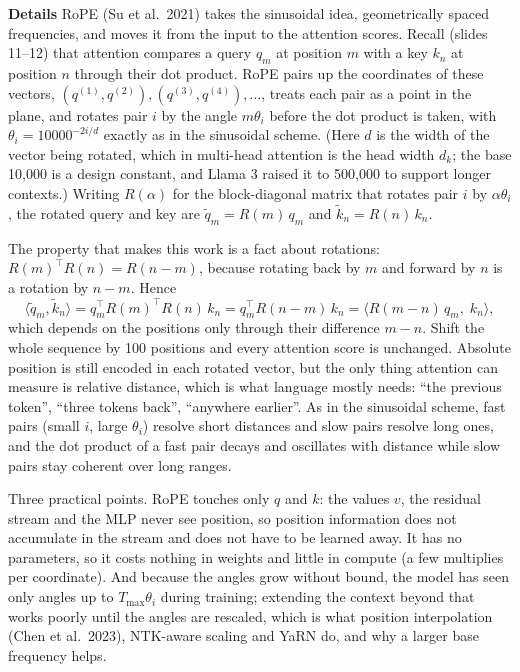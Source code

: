 \documentclass[11pt,letterpaper]{article}
\newcommand{\para}[1]{\medskip\noindent\textbf{#1}\quad}
\newcommand{\dk}{d_k}
\newcommand{\Tmax}{T_{\max}}
\begin{document}
\para{Details} RoPE (Su et al.\ 2021) takes the sinusoidal idea, geometrically spaced frequencies, and moves it from the input to the attention scores. Recall (slides 11--12) that attention compares a query $q_m$ at position $m$ with a key $k_n$ at position $n$ through their dot product. RoPE pairs up the coordinates of these vectors, $(q^{(1)},q^{(2)}),(q^{(3)},q^{(4)}),\dots$, treats each pair as a point in the plane, and rotates pair $i$ by the angle $m\theta_i$ before the dot product is taken, with $\theta_i=10000^{-2i/d}$ exactly as in the sinusoidal scheme. (Here $d$ is the width of the vector being rotated, which in multi-head attention is the head width $\dk$; the base 10,000 is a design constant, and Llama 3 raised it to 500,000 to support longer contexts.) Writing $R(\alpha)$ for the block-diagonal matrix that rotates pair $i$ by $\alpha\theta_i$, the rotated query and key are $\tilde q_m=R(m)\,q_m$ and $\tilde k_n=R(n)\,k_n$.

The property that makes this work is a fact about rotations: $R(m)^{\top}R(n)=R(n-m)$, because rotating back by $m$ and forward by $n$ is a rotation by $n-m$. Hence
\[
\langle\tilde q_m,\tilde k_n\rangle=q_m^{\top}R(m)^{\top}R(n)\,k_n=q_m^{\top}R(n-m)\,k_n=\big\langle R(m-n)\,q_m,\;k_n\big\rangle,
\]
which depends on the positions only through their difference $m-n$. Shift the whole sequence by 100 positions and every attention score is unchanged. Absolute position is still encoded in each rotated vector, but the only thing attention can measure is relative distance, which is what language mostly needs: ``the previous token'', ``three tokens back'', ``anywhere earlier''. As in the sinusoidal scheme, fast pairs (small $i$, large $\theta_i$) resolve short distances and slow pairs resolve long ones, and the dot product of a fast pair decays and oscillates with distance while slow pairs stay coherent over long ranges.

Three practical points. RoPE touches only $q$ and $k$: the values $v$, the residual stream and the MLP never see position, so position information does not accumulate in the stream and does not have to be learned away. It has no parameters, so it costs nothing in weights and little in compute (a few multiplies per coordinate). And because the angles grow without bound, the model has seen only angles up to $\Tmax\theta_i$ during training; extending the context beyond that works poorly until the angles are rescaled, which is what position interpolation (Chen et al.\ 2023), NTK-aware scaling and YaRN do, and why a larger base frequency helps.
\end{document}
